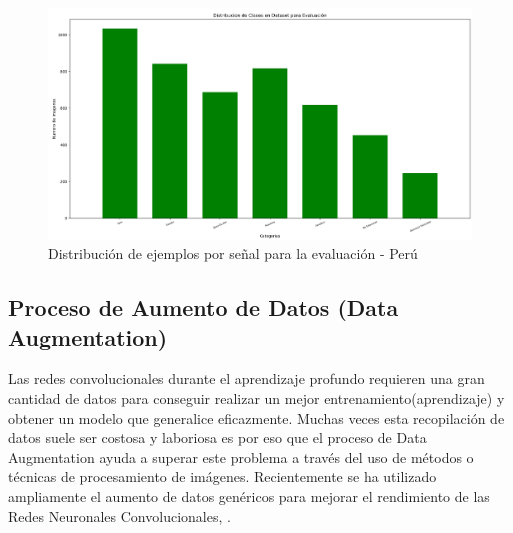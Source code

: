 		\begin{figure}[H]
			\includegraphics[width=1\textwidth]{images/desarrollo/histograms/PeruinitialTest4698}
			\begin{center}
			\caption{\small{Distribución de ejemplos por señal para la evaluación - Perú}}
			{\small{\fontsize{10}{16.8}\selectfont {Fuente: Elaboración propia}}}
			\end{center}
			\vspace{-1.5em}
		\end{figure}

	\subsection{Proceso de Aumento de Datos (Data Augmentation)}

		Las redes convolucionales durante el aprendizaje profundo requieren una gran cantidad de datos para conseguir realizar un mejor entrenamiento(aprendizaje) y obtener un modelo que generalice eficazmente. Muchas veces esta recopilación de datos suele ser costosa y laboriosa es por eso que el proceso de Data Augmentation ayuda a superar este problema a través del uso de métodos o técnicas de procesamiento de imágenes. Recientemente se ha utilizado ampliamente el aumento de datos genéricos para mejorar el rendimiento de las Redes Neuronales Convolucionales, \citep{DL_augmentData}. 

